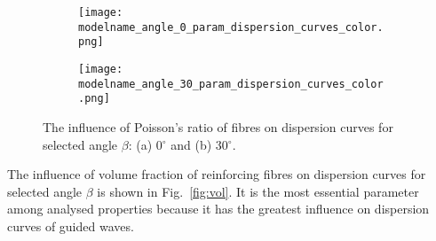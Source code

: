 \documentclass[preprint,12pt]{elsarticle}
\begin{document}
\begin{figure} [h!]
	\centering
	\newcommand{\modelname}{SASE7_plain_weave}
	\begin{subfigure}[b]{0.49\textwidth}
		\centering
		\texttt{[image: \\modelname\_angle\_0\_param\_dispersion\_curves\_color.png]}
		\caption{}
		\label{fig:nif0}
	\end{subfigure}
	\hfill
	\begin{subfigure}[b]{0.49\textwidth}
		\centering
		\texttt{[image: \\modelname\_angle\_30\_param\_dispersion\_curves\_color.png]}
		\caption{}
		\label{fig:nif30}
	\end{subfigure}
	\caption{The influence of Poisson's ratio of fibres on dispersion curves for selected angle $\beta$: (a) 0$^{\circ}$ and (b) 30$^{\circ}$.} 
	\label{fig:nif}
\end{figure}

The influence of volume fraction of reinforcing fibres on dispersion curves for selected angle $\beta$ is shown in Fig.~\ref{fig:vol}. It is the most essential parameter among analysed properties because it has the greatest influence on dispersion curves of guided waves.
\end{document}
